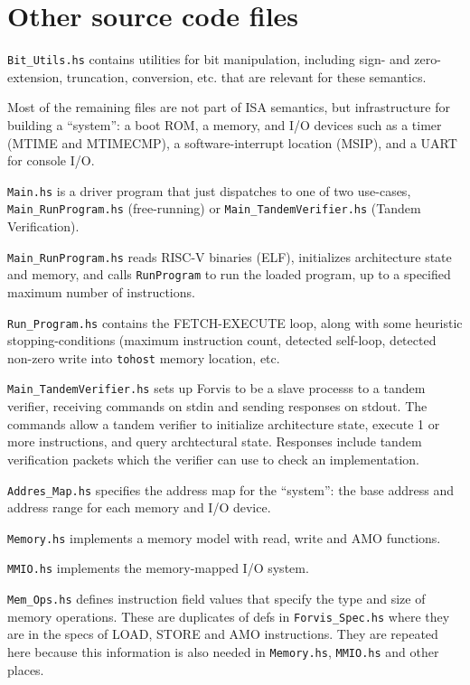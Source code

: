 \documentclass[11pt]{article}
\begin{document}

\section{Other source code files}

\label{sec_misc}

\verb|Bit_Utils.hs| contains utilities for bit manipulation, including
sign- and zero-extension, truncation, conversion, etc. that are
relevant for these semantics.

Most of the remaining files are not part of ISA semantics, but
infrastructure for building a ``system'': a boot ROM, a memory, and
I/O devices such as a timer (MTIME and MTIMECMP), a software-interrupt
location (MSIP), and a UART for console I/O.

\verb|Main.hs| is a driver program that just dispatches to one of two
use-cases, \verb|Main_RunProgram.hs| (free-running) or
\verb|Main_TandemVerifier.hs| (Tandem Verification).

\verb|Main_RunProgram.hs| reads RISC-V binaries (ELF), initializes
architecture state and memory, and calls \verb|RunProgram| to run the
loaded program, up to a specified maximum number of instructions.

\verb|Run_Program.hs| contains the FETCH-EXECUTE loop, along with some
heuristic stopping-conditions (maximum instruction count, detected
self-loop, detected non-zero write into \verb|tohost| memory location,
etc.

\verb|Main_TandemVerifier.hs| sets up Forvis to be a slave processs to
a tandem verifier, receiving commands on stdin and sending responses
on stdout.  The commands allow a tandem verifier to initialize
architecture state, execute 1 or more instructions, and query
archtectural state. Responses include tandem verification packets
which the verifier can use to check an implementation.

\verb|Addres_Map.hs| specifies the address map for the ``system'': the
base address and address range for each memory and I/O device.

\verb|Memory.hs| implements a memory model with read, write and AMO
functions.

\verb|MMIO.hs| implements the memory-mapped I/O system.

\verb|Mem_Ops.hs| defines instruction field values that specify the
type and size of memory operations.  These are duplicates of defs in
\verb|Forvis_Spec.hs| where they are in the specs of LOAD, STORE and
AMO instructions.  They are repeated here because this information is
also needed in \verb|Memory.hs|, \verb|MMIO.hs| and other places.
\end{document}

